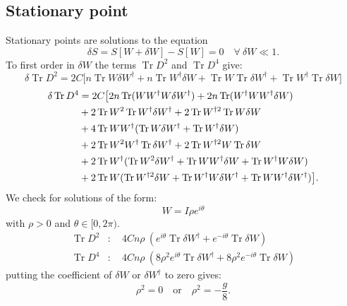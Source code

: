 \documentclass[12pt,a4paper]{article}
\DeclareMathOperator{\Tr}{Tr}
\newcommand{\eit}{e^{i \theta}}
\newcommand{\emit}{e^{-i \theta}}
\begin{document}
\subsection{Stationary point}
Stationary points are solutions to the equation
\begin{equation}
\delta S = S[W + \delta W] - S[W] = 0 \quad  \forall \ \delta W \ll 1.
\end{equation}
To first order in $\delta W$ the terms $\Tr D^2$ and $\Tr D^4$ give:
\begin{equation}
\delta \Tr D^2 = 2 C \big[ n \Tr W \delta W^\dagger + n \Tr W^\dagger \delta W + \Tr W \Tr \delta W^\dagger + \Tr W^\dagger \Tr \delta W \big]
\end{equation}
\begin{align}
\delta \Tr D^4 &= 2 C \big[ 2n \Tr ( W W^\dagger W \delta W^\dagger) + 2n \Tr ( W^\dagger W W^\dagger \delta W) \notag \\ 
&+ 2 \Tr W^2 \Tr W^\dagger \delta W^\dagger +  2 \Tr W^{\dagger 2} \Tr W \delta W \notag \\
&+ 4 \Tr W W^\dagger ( \Tr W \delta W^\dagger + \Tr W^\dagger \delta W) \notag \\ 
&+ 2 \Tr W^2 W^\dagger \Tr \delta W^\dagger + 2 \Tr W^{\dagger 2} W \Tr \delta W \notag \\
&+ 2 \Tr W^\dagger ( \Tr W^2 \delta W^\dagger + \Tr W W^\dagger \delta W + \Tr W^\dagger W \delta W) \notag \\
&+ 2 \Tr W ( \Tr W^{\dagger 2} \delta W + \Tr W^\dagger W \delta W^\dagger + \Tr W W^\dagger \delta W^\dagger) \big].
\end{align}
We check for solutions of the form:
\begin{equation}
W = I \rho e^{i \theta}
\end{equation}
with $\rho > 0$ and $\theta \in [0, 2 \pi )$.
\begin{align}
\Tr D^2&: \quad 4 C n \rho \ ( \eit \Tr \delta W^\dagger + \emit \Tr \delta W) \\
\Tr D^4&: \quad 4 C n \rho \ ( 8 \rho^2 \eit \Tr \delta W^\dagger + 8 \rho^2 \emit \Tr \delta W)
\end{align}
putting the coefficient of $\delta W$ or $\delta W^\dagger$ to zero gives:
\begin{equation}
\rho^2 = 0 \quad \text{or} \quad \rho^2 = -\frac{g}{8}.
\end{equation}
\end{document}
